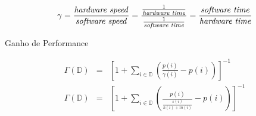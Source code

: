 \begin{frame}

\begin{equation}
\gamma =
\frac{
   \text{\textit{hardware speed}}
}{
   \text{\textit{software speed}}
}
=
\frac{
   \frac{
      1
   } {
      \text{\textit{hardware time}}
   }
} {
   \frac{
      1
   }{
      \text{\textit{software time}}
   }
}
=
\frac{
   \text{\textit{software time}}
} {
   \text{\textit{hardware time}}
}
\end{equation}
\end{frame}


\begin{frame}{Ganho de Performance} \vspace{-1em}

\begin{eqnarray}
\Gamma (\mathbb{D}) & = &
\left [
1 + \sum _{i \in \mathbb{D}} \left (
\frac{
   p(i)
}{
   \gamma(i)
}-p(i)
\right)
\right ]^{-1} \\
\Gamma (\mathbb{D}) & = &
\left [
1 + \sum _{i \in \mathbb{D}} \left (
\frac{
   p(i)
}{
   \frac{s(i)}{h(i) + m(i)}
}-p(i)
\right)
\right ]^{-1} \label{eq:d_final}
\end{eqnarray}

\end{frame}